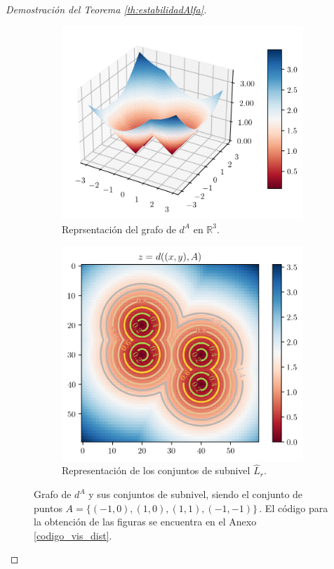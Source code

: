 \begin{proof}[Demostración del Teorema \ref{th:estabilidadAlfa}]
\begin{figure}[!ht]
\centering
\begin{subfigure}{0.45\textwidth}
\centering
\includegraphics[width=\textwidth]{../code/output/grafoDistancias.png} 
\caption{Reprsentación del grafo de $d^A$ en $\mathbb{R}^3$.}
\label{ref:grafoDistConj}
\end{subfigure}\hspace{0.1\textwidth}%
\begin{subfigure}{0.45\textwidth}
\centering
\includegraphics[width=\textwidth]{../code/output/subnivelDistancias.png} 
\caption{Representación de los conjuntos de subnivel $\widehat{L}_r$.}
\label{ref:subnivelDistConj}
\end{subfigure}
\caption{Grafo de $d^A$ y sus conjuntos de subnivel, siendo el conjunto de puntos $A = \{(-1, 0), (1, 0), (1, 1), (-1, -1)\}\,$. El código para la obtención de las figuras se encuentra en el Anexo \ref{codigo_vis_dist}.}
\label{ref:figDistConj}
\end{figure}


\end{proof}
